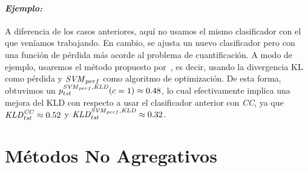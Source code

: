 \paragraph{\it Ejemplo:\/} A diferencia de los casos anteriores, aquí no usamos
el mismo clasificador con el que veníamos trabajando. En cambio, se ajusta un
nuevo clasificador pero con una función de pérdida más acorde al problema de
cuantificación. A modo de ejemplo, usaremos el método propuesto
por~\citet{esuli2010sentiment}, es decir, usando la divergencia KL como pérdida
y ${\it{SVM}}_{perf}$ como algoritmo de optimización. De esta forma, obtuvimos
un $p^{{\it{SVM}}_{perf}, {\it{KLD}}}_{tst}(c=1) \approx 0.48$, lo cual
efectivamente implica una mejora del KLD con respecto a usar el clasificador
anterior con {\it CC}, ya que ${\it{KLD}}^{\it{CC}}_{tst} \approx 0.52$ y
${\it{KLD}}^{{\it{SVM}}_{perf}, {\it{KLD}}}_{tst} \approx 0.32$.

\section{Métodos No Agregativos}\label{puntual:no_agregativos}
